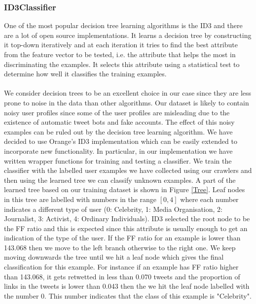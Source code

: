 \subsubsection{ID3Classifier}
One of the most popular decision tree learning algorithms is the ID3 and there are a lot of open source implementations. It learns a decision tree by constructing it top-down iteratively and 
at each iteration it tries to find the best attribute from the feature vector to be tested, i.e. the attribute that helps the most in discriminating the examples. It selects this attribute using
a statistical test to determine how well it classifies the training examples.\\\\
We consider decision trees to be an excellent choice in our case since they are less prone to noise in the data than other algorithms. Our dataset is likely to contain noisy user profiles since some of the user profiles are misleading due to the existence of automatic tweet bots and fake accounts. The effect of this noisy examples can be ruled out by the decision tree learning algorithm.  
We have decided to use Orange's ID3 implementation which can be easily extended to incorporate new functionality. In particular, in our implementation we have written wrapper functions for training and testing a classifier. We train the classifier with the labelled user examples we have collected using our crawlers and then using the learned tree we can classify unknown examples. A part of the learned tree based on our training dataset is shown in Figure \ref{Tree}. Leaf nodes in this tree are labelled with numbers in the range $[0, 4]$ where each number indicates a different type of user (0: Celebrity, 1: Media Organisation, 2: Journalist, 3: Activist, 4: Ordinary Individuals). ID3 selected the root node to be the FF ratio and this is expected since this attribute is usually enough to get an indication of the type of the user. If the FF ratio for an example is lower than 143.068 then we move to the left branch otherwise to the right one. We keep moving downwards the tree until we hit a leaf node which gives the final classification for this example. For instance if an example has FF ratio higher than 143.068, it gets retwetted in less than 0.070 tweets and the proportion of links in the tweets is lower than 0.043 then the we hit the leaf node labelled with the number $0$. This number indicates that the class of this example is "Celebrity".

